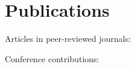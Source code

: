 \chapter*{Publications}

\noindent
Articles in peer-reviewed journals:
\begin{refsection}[ownpubs]
  \small%
  \nocite{*}
  \printbibliography[heading=none,type=article]
\end{refsection}

\noindent
Conference contributions:
\begin{refsection}[ownpubs]
  \small%
  \nocite{*}
  \printbibliography[heading=none,type=inproceedings]
\end{refsection}


